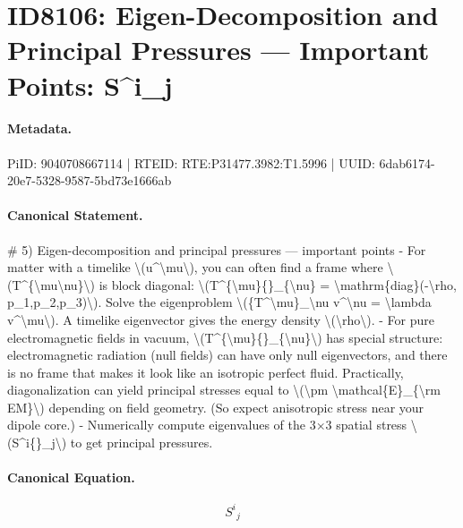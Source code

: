 \section*{ID8106: Eigen-Decomposition and Principal Pressures — Important Points: S\textasciicircum{}i\_j}
\paragraph{Metadata.}
PiID: 9040708667114 | RTEID: RTE:P31477.3982:T1.5996 | UUID: 6dab6174-20e7-5328-9587-5bd73e1666ab

\paragraph{Canonical Statement.}
\# 5) Eigen-decomposition and principal pressures — important points - For matter with a timelike \textbackslash{}(u\textasciicircum{}\textbackslash{}mu\textbackslash{}), you can often find a frame where \textbackslash{}(T\textasciicircum{}\{\textbackslash{}mu\textbackslash{}nu\}\textbackslash{}) is block diagonal: \textbackslash{}(T\textasciicircum{}\{\textbackslash{}mu\}\{\}\_\{\textbackslash{}nu\} = \textbackslash{}mathrm\{diag\}(-\textbackslash{}rho, p\_1,p\_2,p\_3)\textbackslash{}). Solve the eigenproblem \textbackslash{}(\{T\textasciicircum{}\textbackslash{}mu\}\_\textbackslash{}nu v\textasciicircum{}\textbackslash{}nu = \textbackslash{}lambda v\textasciicircum{}\textbackslash{}mu\textbackslash{}). A timelike eigenvector gives the energy density \textbackslash{}(\textbackslash{}rho\textbackslash{}). - For pure electromagnetic fields in vacuum, \textbackslash{}(T\textasciicircum{}\{\textbackslash{}mu\}\{\}\_\{\textbackslash{}nu\}\textbackslash{}) has special structure: electromagnetic radiation (null fields) can have only null eigenvectors, and there is no frame that makes it look like an isotropic perfect fluid. Practically, diagonalization can yield principal stresses equal to \textbackslash{}(\textbackslash{}pm \textbackslash{}mathcal\{E\}\_\{\textbackslash{}rm EM\}\textbackslash{}) depending on field geometry. (So expect anisotropic stress near your dipole core.) - Numerically compute eigenvalues of the 3×3 spatial stress \textbackslash{}(S\textasciicircum{}i\{\}\_j\textbackslash{}) to get principal pressures.

\paragraph{Canonical Equation.}
\[
S^i{}_j
\]

